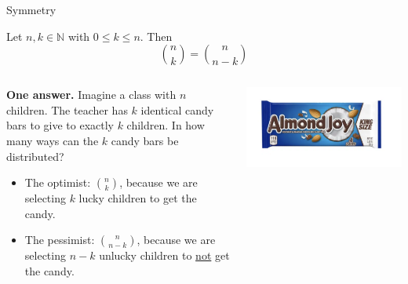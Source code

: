\documentclass[10pt]{beamer}
\begin{document}
\begin{frame}{Symmetry}
\footnotesize 
\begin{mygreenbox}[title=Scheinerman Prop 17.7]
Let $n,k \in \mathbb{N}$ with $0 \leq k \leq n$.  Then 
\[ \binom{n}{k} =\binom{n}{n-k} \]
\end{mygreenbox}

\vfill 

\begin{myyellowbox}[title=\text{Poll: What is the intuition?}]
\pause 


\begin{columns}
    \begin{column}{0.7\textwidth}
        \textbf{One answer.} Imagine a class with $n$ children. The teacher has $k$ identical candy bars to give to exactly $k$ children. In how many ways can the $k$ candy bars be distributed?
        \begin{itemize}
            \item The optimist:  $\binom{n}{k} $, because we are selecting $k$ lucky children to get the candy.
            \item The pessimist: 	$\binom{n}{n-k}$, because we are selecting $n-k$ unlucky children to \underline{not} get the candy.
        \end{itemize}
    \end{column}
    \begin{column}{0.25\textwidth}
        \includegraphics[width=\textwidth]{images/almond_joy}
    \end{column}
\end{columns}
\end{myyellowbox}

\end{frame}
\end{document}
